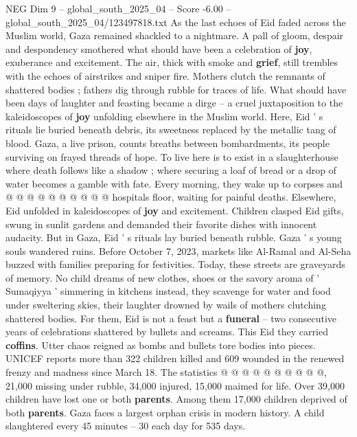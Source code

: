 \begin{textsample}{NEG Dim 9 – global\_south\_2025\_04 – Score -6.00 – global\_south\_2025\_04/123497818.txt}  \label{ex:f9_neg_293}
As the last echoes of Eid faded across the Muslim world, Gaza remained shackled to a nightmare.
A pall of gloom, despair and despondency smothered what should have been a celebration of \textbf{joy}, exuberance and excitement.
The air, thick with smoke and \textbf{grief}, still trembles with the echoes of airstrikes and sniper fire.
Mothers clutch the remnants of shattered bodies ; fathers dig through rubble for traces of life.
What should have been days of laughter and feasting became a dirge -- a cruel juxtaposition to the kaleidoscopes of \textbf{joy} unfolding elsewhere in the Muslim world.
Here, Eid ' s rituals lie buried beneath debris, its sweetness replaced by the metallic tang of blood.
Gaza, a live prison, counts breaths between bombardments, its people surviving on frayed threads of hope.
To live here is to exist in a slaughterhouse where death follows like a shadow ; where securing a loaf of bread or a drop of water becomes a gamble with fate.
Every morning, they wake up to corpses and @ @ @ @ @ @ @ @ @ @ hospitals floor, waiting for painful deaths.
Elsewhere, Eid unfolded in kaleidoscopes of \textbf{joy} and excitement.
Children clasped Eid gifts, swung in sunlit gardens and demanded their favorite dishes with innocent audacity.
But in Gaza, Eid ' s rituals lay buried beneath rubble.
Gaza ' s young souls wandered ruins.
Before October 7, 2023, markets like Al-Ramal and Al-Seha buzzed with families preparing for festivities.
Today, these streets are graveyards of memory.
No child dreams of new clothes, shoes or the savory aroma of ' Sumaqiyya ' simmering in kitchens instead, they scavenge for water and food under sweltering skies, their laughter drowned by wails of mothers clutching shattered bodies.
For them, Eid is not a feast but a \textbf{funeral} -- two consecutive years of celebrations shattered by bullets and screams.
This Eid they carried \textbf{coffins}.
Utter chaos reigned as bombs and bullets tore bodies into pieces.
UNICEF reports more than 322 children killed and 609 wounded in the renewed frenzy and madness since March 18.
The statistics @ @ @ @ @ @ @ @ @ @, 21,000 missing under rubble, 34,000 injured, 15,000 maimed for life.
Over 39,000 children have lost one or both \textbf{parents}.
Among them 17,000 children deprived of both \textbf{parents}.
Gaza faces a largest orphan crisis in modern history.
A child slaughtered every 45 minutes -- 30 each day for 535 days.

\end{textsample}
